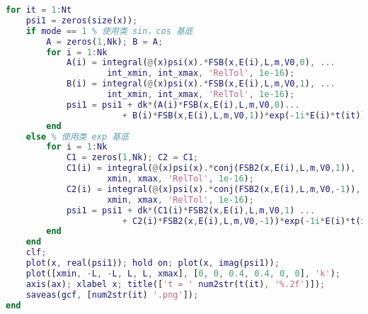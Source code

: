 \begin{lstlisting}[language=matlab, caption=FSBsct.m]
for it = 1:Nt
    psi1 = zeros(size(x));
    if mode == 1 % 使用类 sin，cos 基底
        A = zeros(1,Nk); B = A;
        for i = 1:Nk
            A(i) = integral(@(x)psi(x).*FSB(x,E(i),L,m,V0,0), ...
                    int_xmin, int_xmax, 'RelTol', 1e-16);
            B(i) = integral(@(x)psi(x).*FSB(x,E(i),L,m,V0,1), ...
                    int_xmin, int_xmax, 'RelTol', 1e-16);
            psi1 = psi1 + dk*(A(i)*FSB(x,E(i),L,m,V0,0)...
                       + B(i)*FSB(x,E(i),L,m,V0,1))*exp(-1i*E(i)*t(it));
        end
    else % 使用类 exp 基底
        for i = 1:Nk
            C1 = zeros(1,Nk); C2 = C1;
            C1(i) = integral(@(x)psi(x).*conj(FSB2(x,E(i),L,m,V0,1)), ...
                    xmin, xmax, 'RelTol', 1e-16);
            C2(i) = integral(@(x)psi(x).*conj(FSB2(x,E(i),L,m,V0,-1)), ...
                    xmin, xmax, 'RelTol', 1e-16);
            psi1 = psi1 + dk*(C1(i)*FSB2(x,E(i),L,m,V0,1) ...
                       + C2(i)*FSB2(x,E(i),L,m,V0,-1))*exp(-1i*E(i)*t(it));
        end
    end
    clf;
    plot(x, real(psi1)); hold on; plot(x, imag(psi1));
    plot([xmin, -L, -L, L, L, xmax], [0, 0, 0.4, 0.4, 0, 0], 'k');
    axis(ax); xlabel x; title(['t = ' num2str(t(it), '%.2f')]);
    saveas(gcf, [num2str(it) '.png']);
end
\end{lstlisting}
